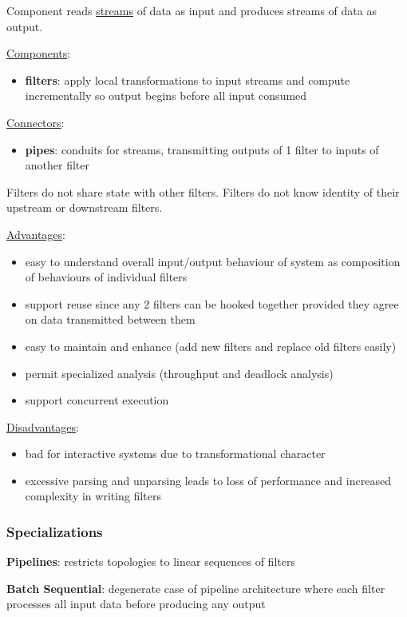 \documentclass[11pt]{article}
\begin{document}
Component reads \uline{streams} of data as input and produces streams of data as output.

\uline{Components}:
\begin{itemize}
\item \textbf{filters}: apply local transformations to input streams and compute incrementally so output begins
before all input consumed
\end{itemize}

\uline{Connectors}:
\begin{itemize}
\item \textbf{pipes}: conduits for streams, transmitting outputs of 1 filter to inputs of another filter
\end{itemize}

Filters do not share state with other filters.
Filters do not know identity of their upstream or downstream filters.

\uline{Advantages}:
\begin{itemize}
\item easy to understand overall input/output behaviour of system as composition of behaviours of
individual filters
\item support reuse since any 2 filters can be hooked together provided they agree on data transmitted
between them
\item easy to maintain and enhance (add new filters and replace old filters easily)
\item permit specialized analysis (throughput and deadlock analysis)
\item support concurrent execution
\end{itemize}

\uline{Disadvantages}:
\begin{itemize}
\item bad for interactive systems due to transformational character
\item excessive parsing and unparsing leads to loss of performance and increased complexity in
writing filters
\end{itemize}
\subsubsection{Specializations}
\label{sec:orgf9cee6a}
\textbf{Pipelines}: restricts topologies to linear sequences of filters

\textbf{Batch Sequential}: degenerate case of pipeline architecture where each filter processes all
input data before producing any output
\end{document}
